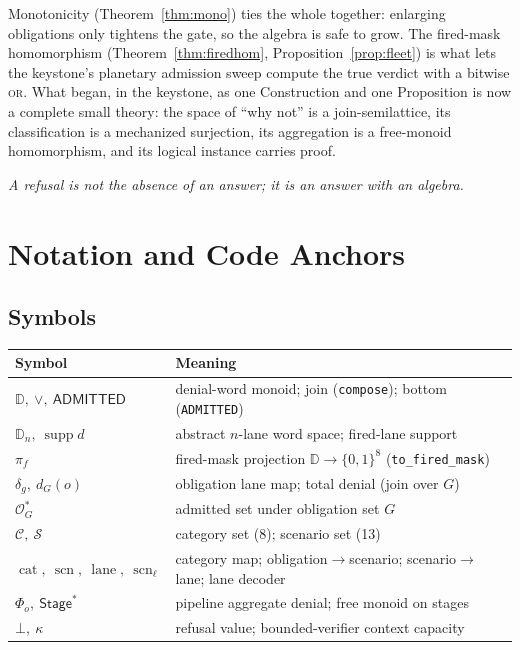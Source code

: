 \documentclass[11pt,oneside]{book}
\theoremstyle{definition}
\theoremstyle{plain}
\theoremstyle{remark}
\newcommand{\Adm}{\mathcal{O}^{*}}             %
\newcommand{\Rfsl}{\bot}                        %
\newcommand{\CL}{\kappa}                       %
\DeclareMathOperator{\supp}{supp}
\newcommand{\code}[1]{\texttt{#1}}
\newcommand{\Deny}{\mathbb{D}}                 %
\newcommand{\Adml}{\mathsf{ADMITTED}}          %
\newcommand{\firedmap}{\pi_{f}}                %
\newcommand{\Catset}{\mathcal{C}}              %
\newcommand{\Scnset}{\mathcal{S}}              %
\DeclareMathOperator{\catop}{cat}
\DeclareMathOperator{\laneop}{lane}
\DeclareMathOperator{\scnop}{scn}
\begin{document}
Monotonicity (Theorem~\ref{thm:mono}) ties the whole together: enlarging obligations only
tightens the gate, so the algebra is safe to grow. The fired-mask homomorphism
(Theorem~\ref{thm:firedhom}, Proposition~\ref{prop:fleet}) is what lets the keystone's
planetary admission sweep compute the true verdict with a bitwise \textsc{or}. What began, in
the keystone, as one Construction and one Proposition is now a complete small theory: the space
of ``why not'' is a join-semilattice, its classification is a mechanized surjection, its
aggregation is a free-monoid homomorphism, and its logical instance carries proof.

\begin{center}\itshape A refusal is not the absence of an answer; it is an answer with an algebra.\end{center}

\appendix
\chapter{Notation and Code Anchors}

\section*{Symbols}
\begin{center}
\begin{tabular}{ll}
\toprule
Symbol & Meaning\\
\midrule
$\Deny,\ \lor,\ \Adml$ & denial-word monoid; join (\code{compose}); bottom (\code{ADMITTED})\\
$\Deny_n,\ \supp d$ & abstract $n$-lane word space; fired-lane support\\
$\firedmap$ & fired-mask projection $\Deny\to\{0,1\}^{8}$ (\code{to\_fired\_mask})\\
$\delta_g,\ d_G(o)$ & obligation lane map; total denial (join over $G$)\\
$\Adm_G$ & admitted set under obligation set $G$\\
$\Catset,\ \Scnset$ & category set (8); scenario set (13)\\
$\catop,\ \scnop,\ \laneop,\ \scnop_\ell$ & category map; obligation$\to$scenario; scenario$\to$lane; lane decoder\\
$\Phi_o,\ \mathsf{Stage}^{*}$ & pipeline aggregate denial; free monoid on stages\\
$\Rfsl,\ \CL$ & refusal value; bounded-verifier context capacity\\
\bottomrule
\end{tabular}
\end{center}
\end{document}
